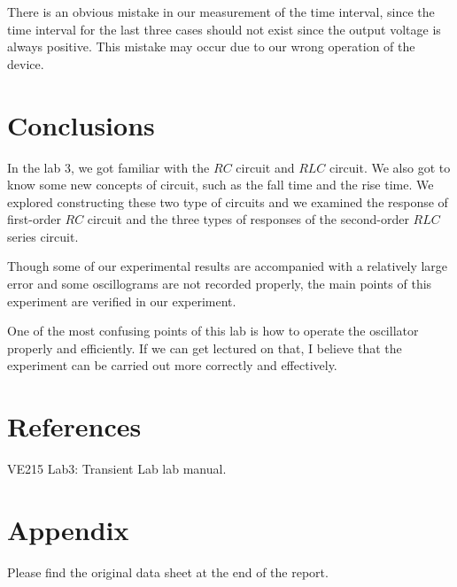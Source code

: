 \documentclass{article}
\begin{document}
There is an obvious mistake in our measurement of the time interval, since the time interval for the last three cases should not exist since the output voltage is always positive. This mistake may occur due to our wrong operation of the device.

\section{Conclusions}

In the lab 3, we got familiar with the $RC$ circuit and $RLC$ circuit. We also got to know some new concepts of circuit, such as the fall time and the rise time. We explored constructing these two type of circuits and we examined the response of first-order $RC$ circuit and the three types of responses of the second-order $RLC$ series circuit.

Though some of our experimental results are accompanied with a relatively large error and some oscillograms are not recorded properly, the main points of this experiment are verified in our experiment.

One of the most confusing points of this lab is how to operate the oscillator properly and efficiently. If we can get lectured on that, I believe that the experiment can be carried out more correctly and effectively.

\section{References}

\noindent [1] VE215 \hspace{0.5em} Lab3: Transient Lab lab manual.

\section{Appendix}

Please find the original data sheet at the end of the report.
\end{document}
